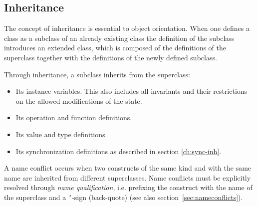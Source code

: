 \documentclass[\pformat,12pt]{article}
\newcommand{\vppsmall}{\small\tt}
\begin{document}
\subsection{Inheritance}\label{ch:inherit}

The concept of inheritance is essential to object orientation.  When
one defines a class as a subclass of an already existing class the
definition of the subclass introduces an extended class, which is
composed of the definitions of the superclass together with the
definitions of the newly defined subclass. 

Through inheritance, a subclass inherits from the superclass:
\begin{itemize}
\item Its instance variables. %
  This also includes
  all invariants and their restrictions on the allowed modifications of
  the state.
\item Its operation and function definitions. 
\item Its value and type definitions.
\item Its synchronization definitions as described in
  section \ref{ch:sync-inh}.
\end{itemize}

A name conflict occurs when two constructs of the same kind and with the
same name are inherited from different superclasses.
Name conflicts must be explicitly resolved through {\it name qualification},
i.e. prefixing the construct with the name of the superclass and a
{\vppsmall `}-sign (back-quote) (see also section~\ref{sec:nameconflicts}).
\end{document}
